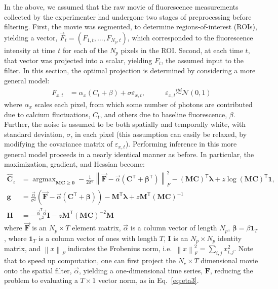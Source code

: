 \documentclass{article}
\providecommand{\ve}[1]{\boldsymbol{#1}}
\providecommand{\norm}[1]{\left \lVert#1 \right  \rVert}
\newcommand{\T}{^{\ensuremath{\mathsf{T}}}}           %
\DeclareMathOperator*{\argmax}{argmax}
\newcommand{\bC}{\ve{C}}
\newcommand{\bF}{\ve{F}}
\newcommand{\bI}{\ve{I}}
\newcommand{\bM}{\ve{M}}
\newcommand{\vF}{\vec{F}}
\newcommand{\hbC}{\widehat{\ve{C}}}
\newcommand{\vbF}{\vec{\ve{F}}}
\newcommand{\sig}{\sigma}
\newcommand{\bbeta}{\ve{\beta}}
\newcommand{\blam}{\ve{\lambda}}
\newcommand{\valpha}{\vec{\alpha}}
\newcommand{\zzz}{z}
\newcommand{\az}{\argmax_{\bM \bC \geq \ve{0}}}
\begin{document}
In the above, we assumed that the raw movie of fluorescence measurements collected by the experimenter had undergone two stages of preprocessing before filtering.  First, the movie was segmented, to determine regions-of-interest (ROIs), yielding a vector, $\vF_t=(F_{1,t}, \ldots, F_{N_p,t})$, which corresponded to the fluorescence intensity at time $t$ for each of the $N_p$ pixels in the ROI.  Second, at each time $t$, that vector was projected into a scalar, yielding $F_t$, the assumed input to the filter.  In this section, the optimal projection is determined by considering a more general model:
\begin{align} \label{eq:bF}
F_{x,t} &= \alpha_x (C_t + \beta) +  \sig \varepsilon_{x,t}, \qquad &\varepsilon_{x,t} \overset{iid}{\sim} \mathcal{N}(0,1)   
\end{align}
\noindent where $\alpha_x$ scales each pixel, from which some number of photons are contributed due to calcium fluctuations, $C_t$, and others due to baseline fluorescence, $\beta$.  Further, the noise is assumed to be both spatially and temporally white, with standard deviation, $\sig$, in each pixel (this assumption can easily be relaxed, by modifying the covariance matrix of $\varepsilon_{x,t}$).  Performing inference in this more general model proceeds in a  nearly identical manner as before. In particular, the maximization, gradient, and Hessian become:
\begin{align} 
\hbC_{\zzz} 
&= \az  -\frac{1}{2 \sig^2} \norm{\vec{\bF} - \valpha (\bC\T +\bbeta\T)}_F^2 - (\bM \bC )\T \blam  + \zzz \log(\bM \bC)\T\ve{1},  \label{eq:eta4}\\
\ve{g} &= \frac{\valpha}{\sig^2}(\vbF -\valpha({\bC\T} + \bbeta)) - \ve{M}\T\blam + \zzz \ve{M}\T (\ve{M} \bC)^{-1} \label{eq:g2} \\
\ve{H} &= -\frac{\valpha\T \valpha}{\sig^2} \ve{I} - \zzz \ve{M}\T (\ve{M} \bC)^{-2} \ve{M} \label{eq:H2}
\end{align}
\noindent where $\vbF$ is an $N_p \times T$ element matrix, $\valpha$ is a column vector of length $N_p$,  $\bbeta=\beta \ve{1}_T$, where $\ve{1}_T$ is a column vector of ones with length $T$, $\bI$ is an $N_p \times N_p$ identity matrix, and $\norm{x}_F$ indicates the Frobenius norm, i.e.\ $\norm{x}_F^2= \sum_{i,j} x_{i,j}^2$.  Note that to speed up computation, one can first project the $N_c \times T$ dimensional movie onto the spatial filter, $\valpha$, yielding a one-dimensional time series, $\bF$, reducing the problem to evaluating a $T \times 1$ vector norm, as in Eq.~\eqref{eq:eta3}.
\end{document}
